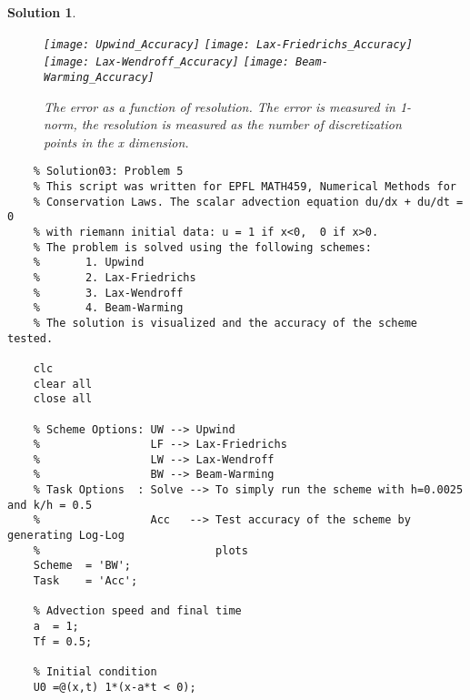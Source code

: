 \documentclass[10pt,letterpaper]{article}
\theoremstyle{break}
\newtheorem{solution}{Solution}
\begin{document}
\begin{solution}
    
    
    \begin{figure}[H] 
    \begin{center}
    {\texttt{[image: Upwind\_Accuracy]}}
    {\texttt{[image: Lax-Friedrichs\_Accuracy]}}
    {\texttt{[image: Lax-Wendroff\_Accuracy]}}
    {\texttt{[image: Beam-Warming\_Accuracy]}}
    \caption{ The error as a function of resolution. The error is measured in 1-norm, the resolution is measured as the number of discretization points in the x dimension. }
    \end{center}
    \end{figure}
    
    
    
    
    \newpage
    
    
    
    \begin{lstlisting}
    % Solution03: Problem 5
    % This script was written for EPFL MATH459, Numerical Methods for
    % Conservation Laws. The scalar advection equation du/dx + du/dt = 0
    % with riemann initial data: u = 1 if x<0,  0 if x>0.
    % The problem is solved using the following schemes:
    %       1. Upwind
    %       2. Lax-Friedrichs
    %       3. Lax-Wendroff
    %       4. Beam-Warming
    % The solution is visualized and the accuracy of the scheme tested.
    
    clc
    clear all
    close all
    
    % Scheme Options: UW --> Upwind
    %                 LF --> Lax-Friedrichs
    %                 LW --> Lax-Wendroff
    %                 BW --> Beam-Warming
    % Task Options  : Solve --> To simply run the scheme with h=0.0025 and k/h = 0.5
    %                 Acc   --> Test accuracy of the scheme by generating Log-Log
    %                           plots
    Scheme 	= 'BW';
    Task 	= 'Acc';
    
    % Advection speed and final time
    a  = 1;
    Tf = 0.5;
    
    % Initial condition
    U0 =@(x,t) 1*(x-a*t < 0);
    

\end{lstlisting}
\end{solution}
\end{document}
